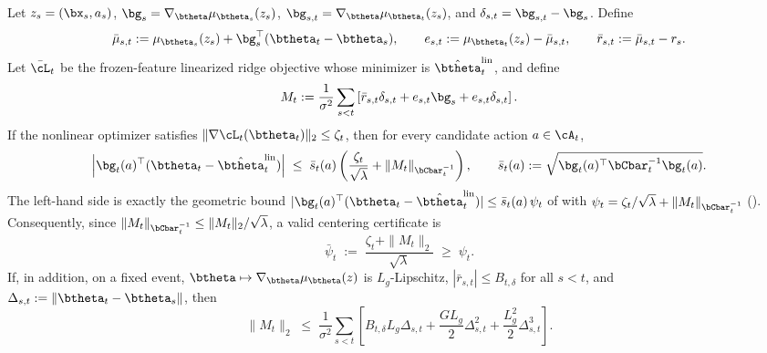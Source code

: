 \begin{lemma}\label{lem:primitive-pred}
Let $z_s=(\bx_s,a_s)$,
$\bg_s=\nabla_{\btheta}\mu_{\btheta_s}(z_s)$,
$\bg_{s,t}=\nabla_{\btheta}\mu_{\btheta_t}(z_s)$, and
$\delta_{s,t}=\bg_{s,t}-\bg_s$.  Define
\[
  \bar\mu_{s,t}
  :=
  \mu_{\btheta_s}(z_s)+\bg_s^\top(\btheta_t-\btheta_s),
  \qquad
  e_{s,t}:=\mu_{\btheta_t}(z_s)-\bar\mu_{s,t},
  \qquad
  \bar r_{s,t}:=\bar\mu_{s,t}-r_s .
\]
Let $\bar{\cL}_t$ be the frozen-feature linearized ridge objective whose
minimizer is $\hat\btheta_t^{\mathrm{lin}}$, and define
\[
  M_t
  :=
  \frac{1}{\sigma^2}
  \sum_{s<t}
  \left[
    \bar r_{s,t}\delta_{s,t}
    +
    e_{s,t}\bg_s
    +
    e_{s,t}\delta_{s,t}
  \right].
\]
If the nonlinear optimizer satisfies
$\|\nabla \cL_t(\btheta_t)\|_2\le\zeta_t$, then for every candidate
action $a\in\cA_t$,
\[
  \left|
  \bg_t(a)^\top
  (\btheta_t-\hat\btheta_t^{\mathrm{lin}})
  \right|
  \;\le\;
  \bar s_t(a)
  \left(
    \frac{\zeta_t}{\sqrt{\lambda}}
    +
    \|M_t\|_{\bCbar_t^{-1}}
  \right),
  \qquad
  \bar s_t(a):=\sqrt{\bg_t(a)^\top\bCbar_t^{-1}\bg_t(a)} .
\]
The left-hand side is exactly the geometric bound
$|\bg_t(a)^\top(\btheta_t-\hat\btheta_t^{\mathrm{lin}})|\le\bar s_t(a)\,\psi_t$
of  with $\psi_t=\zeta_t/\sqrt\lambda+\|M_t\|_{\bCbar_t^{-1}}$
().  Consequently, since
$\|M_t\|_{\bCbar_t^{-1}}\le\|M_t\|_2/\sqrt{\lambda}$, a valid centering
certificate is
\[
  \bar\psi_t
  \;:=\;
  \frac{\zeta_t+\|M_t\|_2}{\sqrt{\lambda}}
  \;\ge\;
  \psi_t .
\]
If, in addition, on a fixed event,
$\btheta\mapsto\nabla_{\btheta}\mu_{\btheta}(z)$ is $L_g$-Lipschitz,
$|\bar r_{s,t}|\le B_{t,\delta}$ for all $s<t$, and
$\Delta_{s,t}:=\|\btheta_t-\btheta_s\|$, then
\[
  \|M_t\|_2
  \;\le\;
  \frac{1}{\sigma^2}
  \sum_{s<t}
  \left[
    B_{t,\delta} L_g\Delta_{s,t}
    +
    \frac{G L_g}{2}\Delta_{s,t}^2
    +
    \frac{L_g^2}{2}\Delta_{s,t}^3
  \right].
\]
\end{lemma}

